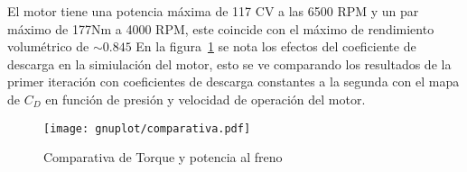 El motor tiene una potencia máxima de 117 CV a las 6500 RPM y un par máximo de
177Nm a 4000 RPM, este coincide con el máximo de rendimiento volumétrico de
$\sim 0.845$
%
En la figura~\ref{fig:PoTi_segunda_op} se nota los efectos del coeficiente de
descarga en la simiulación del motor, esto se ve comparando los resultados de la
primer iteración con coeficientes de descarga constantes a la segunda con el
mapa de $C_{D}$ en función de presión y velocidad de operación del motor.

\begin{figure}[ht]
  \centering
  \texttt{[image: gnuplot/comparativa.pdf]}
  \caption{Comparativa de Torque y potencia al freno} \label{fig:PoTi_segunda_op}
\end{figure}

